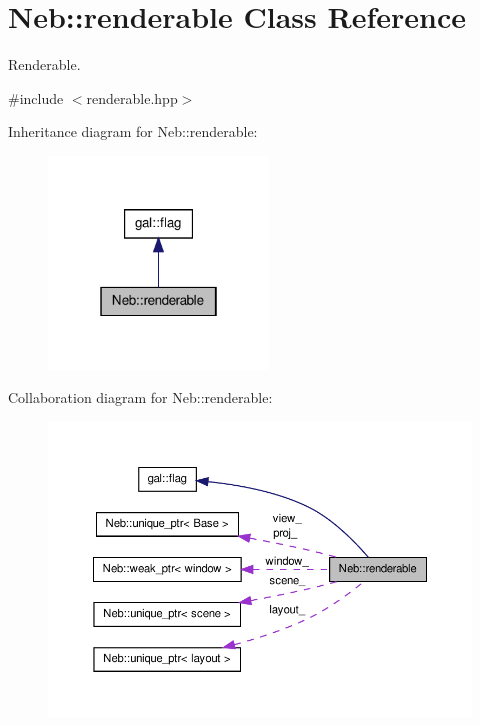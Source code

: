 \hypertarget{classNeb_1_1renderable}{\section{\-Neb\-:\-:renderable \-Class \-Reference}
\label{classNeb_1_1renderable}
}


\-Renderable.  




{\ttfamily \#include $<$renderable.\-hpp$>$}



\-Inheritance diagram for \-Neb\-:\-:renderable\-:\nopagebreak
\begin{figure}[H]
\begin{center}
\leavevmode
\includegraphics[width=166pt]{classNeb_1_1renderable__inherit__graph}
\end{center}
\end{figure}


\-Collaboration diagram for \-Neb\-:\-:renderable\-:\nopagebreak
\begin{figure}[H]
\begin{center}
\leavevmode
\includegraphics[width=350pt]{classNeb_1_1renderable__coll__graph}
\end{center}
\end{figure}
